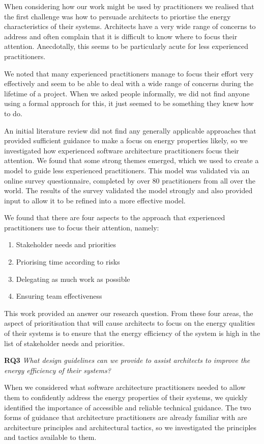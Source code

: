 When considering how our work might be used by practitioners we realised that the first challenge was how to persuade architects to priortise the energy characteristics of their systems.  Architects have a very wide range of concerns to address and often complain that it is difficult to know where to focus their attention.  Anecdotally, this seems to be particularly acute for less experienced practitioners.

We noted that many experienced practitioners manage to focus their effort very effectively and seem to be able to deal with a wide range of concerns during the lifetime of a project.  When we asked people informally, we did not find anyone using a formal approach for this, it just seemed to be something they knew how to do.

An initial literature review did not find any generally applicable approaches that provided sufficient guidance to make a focus on energy properties likely, so we investigated how experienced software architecture practitioners focus their attention.  We found that some strong themes emerged, which we used to create a model to guide less experienced practitioners.  This model was validated via an online survey questionnaire, completed by over 80 practitioners from all over the world.  The results of the survey validated the model strongly and also provided input to allow it to be refined into a more effective model.

We found that there are four aspects to the approach that experienced practitioners use to focus their attention, namely:
\begin{enumerate}
	\item Stakeholder needs and priorities
	\item Priorising time according to risks
	\item Delegating as much work as possible
	\item Ensuring team effectiveness
\end{enumerate}

This work provided an answer our research question.  From these four areas, the aspect of prioritisation that will cause architects to focus on the energy qualities of their systems is to ensure that the energy efficiency of the system is high in the list of stakeholder needs and priorities.

\textbf{RQ3} \emph{What design guidelines can we provide to assist architects to improve the energy efficiency of their systems?}

When we considered what software architecture practitioners needed to allow them to confidently address the energy properties of their systems, we quickly identified the importance of accessible and reliable technical guidance.  The two forms of guidance that architecture practitioners are already familiar with are architecture principles and architectural tactics, so we investigated the principles and tactics available to them.

